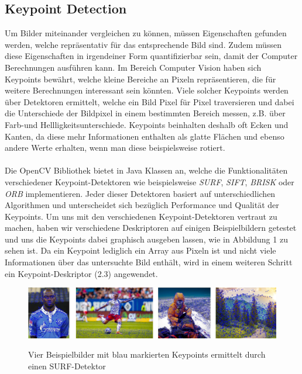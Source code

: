 \documentclass{scrartcl}
\begin{document}
\subsection{Keypoint Detection}
Um Bilder miteinander vergleichen zu können, müssen Eigenschaften gefunden werden, welche repräsentativ für das entsprechende Bild sind. Zudem müssen diese Eigenschaften in irgendeiner Form quantifizierbar sein, damit der Computer Berechnungen ausführen kann. Im Bereich Computer Vision haben sich Keypoints bewährt, welche kleine Bereiche an Pixeln repräsentieren, die für weitere Berechnungen interessant sein könnten. Viele solcher Keypoints werden über Detektoren ermittelt, welche ein Bild Pixel für Pixel traversieren und dabei die Unterschiede der Bildpixel in einem bestimmten Bereich messen, z.B. über Farb-und Hellligkeitsunterschiede. Keypoints beinhalten deshalb oft Ecken und Kanten, da diese mehr Informationen enthalten als glatte Flächen und ebenso andere Werte erhalten, wenn man diese beispielsweise rotiert. 
\\
\\
Die OpenCV Bibliothek bietet in Java Klassen an, welche die Funktionalitäten verschiedener Keypoint-Detektoren wie beispielsweise \textit{SURF}, \textit{SIFT}, \textit{BRISK} oder \textit{ORB} implementieren. Jeder dieser Detektoren basiert auf unterschiedlichen Algorithmen und unterscheidet sich bezüglich Performance und Qualität der Keypoints. Um uns mit den verschiedenen Keypoint-Detektoren vertraut zu machen, haben wir verschiedene Deskriptoren auf einigen Beispielbildern getestet und uns die Keypoints dabei graphisch ausgeben lassen, wie in Abbildung 1 zu sehen ist. Da ein Keypoint lediglich ein Array aus Pixeln ist und nicht viele Informationen über das untersuchte Bild enthält, wird in einem weiteren Schritt ein Keypoint-Deskriptor (2.3) angewendet. 
\begin{figure}[h]
\begin{center}
\includegraphics[scale=0.72]{keypoints.jpg}
\label{fig:keypoints}
\caption{Vier Beispielbilder mit blau markierten Keypoints ermittelt durch einen SURF-Detektor}
\end{center}
\end{figure}
\end{document}
